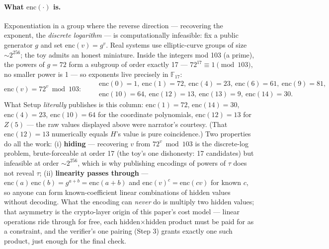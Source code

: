 \documentclass[10pt]{article}
\begin{document}
\paragraph{What $\mathrm{enc}(\cdot)$ is.} Exponentiation in a
group where the reverse direction --- recovering the exponent, the
\emph{discrete logarithm} --- is computationally infeasible: fix a
public generator $g$ and set $\mathrm{enc}(v) = g^v$. Real systems
use elliptic-curve groups of size ${\sim}2^{256}$; the toy admits
an honest miniature. Inside the integers mod 103 (a prime), the
powers of $g = 72$ form a subgroup of order exactly 17 ---
$72^{17} \equiv 1 \pmod{103}$, no smaller power is 1 --- so
exponents live precisely in $\mathbb{F}_{17}$:
\[
\mathrm{enc}(v) = 72^{v} \bmod 103:\qquad
\begin{array}{l}
\mathrm{enc}(0)=1,\ \mathrm{enc}(1)=72,\ \mathrm{enc}(4)=23,\
\mathrm{enc}(6)=61,\ \mathrm{enc}(9)=81,\\
\mathrm{enc}(10)=64,\ \mathrm{enc}(12)=13,\ \mathrm{enc}(13)=9,\
\mathrm{enc}(14)=30.
\end{array}
\]
What Setup \emph{literally} publishes is this column:
$\mathrm{enc}(1)=72$, $\mathrm{enc}(14)=30$, $\mathrm{enc}(4)=23$,
$\mathrm{enc}(10)=64$ for the coordinate polynomials,
$\mathrm{enc}(12)=13$ for $Z(5)$ --- the raw values displayed above
were narrator's courtesy. (That $\mathrm{enc}(12)=13$ numerically
equals $H$'s value is pure coincidence.) Two properties do all the
work: (i) \textbf{hiding} --- recovering $v$ from $72^v \bmod 103$
is the discrete-log problem, brute-forceable at order 17 (the toy's
one dishonesty: 17 candidates) but infeasible at order
${\sim}2^{256}$, which is why publishing encodings of powers of
$\tau$ does not reveal $\tau$; (ii) \textbf{linearity passes
through} --- $\mathrm{enc}(a)\,\mathrm{enc}(b) = g^{a+b} =
\mathrm{enc}(a+b)$ and $\mathrm{enc}(v)^{c} = \mathrm{enc}(cv)$
for known $c$, so anyone can form known-coefficient linear
combinations of hidden values without decoding. What the encoding
can \emph{never} do is multiply two hidden values; that asymmetry
is the crypto-layer origin of this paper's cost model --- linear
operations ride through for free, each hidden$\times$hidden
product must be paid for as a constraint, and the verifier's one
pairing (Step 3) grants exactly one such product, just enough for
the final check.
\end{document}
